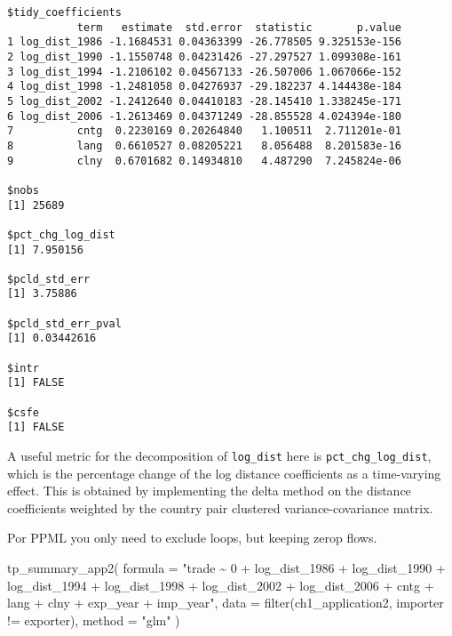 \documentclass[12pt,reqno,oneside,pdftex]{formato-puc/puctesis} %
\newenvironment{Shaded}{\begin{snugshade}}{\end{snugshade}}
\newcommand{\AttributeTok}[1]{\textcolor[rgb]{0.77,0.63,0.00}{#1}}
\newcommand{\FunctionTok}[1]{\textcolor[rgb]{0.00,0.00,0.00}{#1}}
\newcommand{\NormalTok}[1]{#1}
\newcommand{\SpecialCharTok}[1]{\textcolor[rgb]{0.00,0.00,0.00}{#1}}
\newcommand{\StringTok}[1]{\textcolor[rgb]{0.31,0.60,0.02}{#1}}
\begin{document}
\begin{verbatim}
$tidy_coefficients
           term   estimate  std.error  statistic       p.value
1 log_dist_1986 -1.1684531 0.04363399 -26.778505 9.325153e-156
2 log_dist_1990 -1.1550748 0.04231426 -27.297527 1.099308e-161
3 log_dist_1994 -1.2106102 0.04567133 -26.507006 1.067066e-152
4 log_dist_1998 -1.2481058 0.04276937 -29.182237 4.144438e-184
5 log_dist_2002 -1.2412640 0.04410183 -28.145410 1.338245e-171
6 log_dist_2006 -1.2613469 0.04371249 -28.855528 4.024394e-180
7          cntg  0.2230169 0.20264840   1.100511  2.711201e-01
8          lang  0.6610527 0.08205221   8.056488  8.201583e-16
9          clny  0.6701682 0.14934810   4.487290  7.245824e-06

$nobs
[1] 25689

$pct_chg_log_dist
[1] 7.950156

$pcld_std_err
[1] 3.75886

$pcld_std_err_pval
[1] 0.03442616

$intr
[1] FALSE

$csfe
[1] FALSE
\end{verbatim}

A useful metric for the decomposition of \texttt{log\_dist} here is
\texttt{pct\_chg\_log\_dist}, which is the percentage change of the log
distance coefficients as a time-varying effect. This is obtained by
implementing the delta method on the distance coefficients weighted by
the country pair clustered variance-covariance matrix.

Por PPML you only need to exclude loops, but keeping zerop flows.

\begin{Shaded}
\begin{Highlighting}[]
\FunctionTok{tp\_summary\_app2}\NormalTok{(}
  \AttributeTok{formula =} \StringTok{"trade \textasciitilde{} 0 + log\_dist\_1986 + log\_dist\_1990 +}
\StringTok{    log\_dist\_1994 + log\_dist\_1998 + log\_dist\_2002 + log\_dist\_2006 +}
\StringTok{    cntg + lang + clny + exp\_year + imp\_year"}\NormalTok{,}
  \AttributeTok{data =} \FunctionTok{filter}\NormalTok{(ch1\_application2, importer }\SpecialCharTok{!=}\NormalTok{ exporter),}
  \AttributeTok{method =} \StringTok{"glm"}
\NormalTok{)}
\end{Highlighting}
\end{Shaded}
\end{document}
